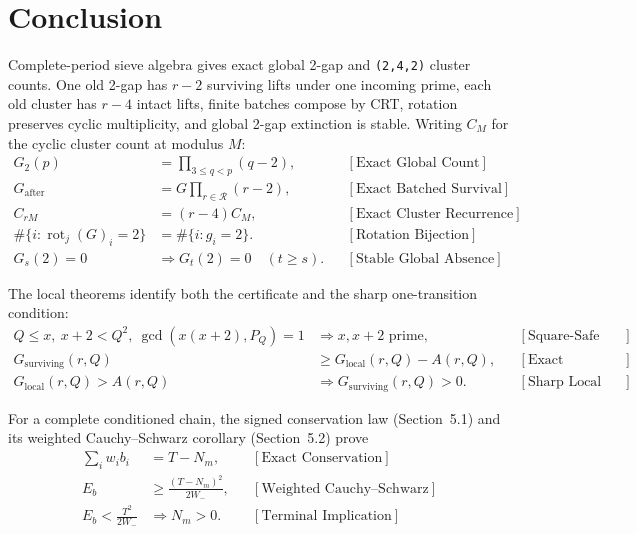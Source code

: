 \section{Conclusion}
\label{sec:conclusion}

Complete-period sieve algebra gives exact global 2-gap and \texttt{(2,4,2)} cluster
counts. One old 2-gap has $r-2$ surviving lifts under one incoming prime,
each old cluster has $r-4$ intact lifts, finite batches compose by CRT,
rotation preserves cyclic multiplicity, and global 2-gap extinction is stable.
Writing $C_M$ for the cyclic cluster count at modulus $M$:
\begin{equation*}
\begin{aligned}
G_2(p)
&=\prod_{3\le q\lt p}(q-2),
&&[\text{Exact Global Count}]\\
G_{\mathrm{after}}
&=G\prod_{r\in\mathcal R}(r-2),
&&[\text{Exact Batched Survival}]\\
C_{rM}&=(r-4)C_M,
&&[\text{Exact Cluster Recurrence}]\\
\#\{i:\operatorname{rot}_j(G)_i=2\}
&=\#\{i:g_i=2\}.
&&[\text{Rotation Bijection}]\\
G_s(2)=0&\Longrightarrow G_t(2)=0\quad(t\ge s).
&&[\text{Stable Global Absence}]
\end{aligned}
\end{equation*}

The local theorems identify both the certificate and the sharp
one-transition condition:
\begin{equation*}
\begin{aligned}
Q\le x,\ x+2\lt Q^2,\ \gcd(x(x+2),P_Q)=1
&\Longrightarrow x,x+2\text{ prime},
&&[\text{Square-Safe Certification}]\\
G_{\mathrm{surviving}}(r,Q)
&\ge G_{\mathrm{local}}(r,Q)-A(r,Q),
&&[\text{Exact Accepted Strikes}]\\
G_{\mathrm{local}}(r,Q)>A(r,Q)
&\Longrightarrow G_{\mathrm{surviving}}(r,Q)>0.
&&[\text{Sharp Local Threshold}]
\end{aligned}
\end{equation*}

For a complete conditioned chain, the signed conservation law (Section~5.1) and its
weighted Cauchy--Schwarz corollary (Section~5.2) prove
\begin{equation*}
\begin{aligned}
\sum_iw_ib_i&=T-N_m,
&&[\text{Exact Conservation}]\\
E_b&\ge\frac{(T-N_m)^2}{2W_-},
&&[\text{Weighted Cauchy--Schwarz}]\\
E_b\lt\frac{T^2}{2W_-}
&\Longrightarrow N_m>0.
&&[\text{Terminal Implication}]
\end{aligned}
\end{equation*}

